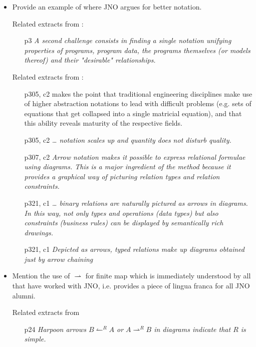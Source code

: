 \documentclass[runningheads,a4paper]{llncs}
\begin{document}
\begin{itemize}
\item Provide an example of where JNO argues for better notation.

Related extracts from \cite{DBLP:conf/lernet/Oliveira08}:
\begin{itemize}
  \item[p3] \it{A second challenge consists in finding a single notation unifying properties of programs, program data, the programs themselves (or models thereof) and their "desirable" relationships.}
\end{itemize}

Related extracts from \cite{DBLP:journals/tse/OliveiraF13}:
\begin{itemize}
  \item[p305, c2] makes the point that traditional engineering disciplines make use of higher abstraction notations to lead with difficult problems (e.g. sets of equations that get collapsed into a single matricial equation), and that this ability reveals maturity of the respective fields.
  \item[p305, c2] \it{… notation scales up and quantity does not disturb quality.}
  \item[p307, c2] \it{Arrow notation makes it possible to express relational formulae using diagrams. This is a major ingredient of the method because it provides a graphical way of picturing relation types and relation constraints.}
  \item[p321, c1] \it{… binary relations are naturally pictured as arrows in diagrams. In this way, not only types and operations (data types) but also constraints (business rules) can be displayed by semantically rich drawings.}
  \item[p321, c1] \it{Depicted as arrows, typed relations make up diagrams obtained just by arrow chaining}
\end{itemize}

\item Mention the use of $\rightharpoonup$ for finite map which is immediately understood by all that have worked with JNO, i.e. provides a piece of lingua franca for all JNO alumni.

Related extracts from \cite{DBLP:conf/lernet/Oliveira08}
\begin{itemize}
  \item[p24] \it{Harpoon arrows $B \leftharpoonup^{R} A$ or $A \rightharpoonup^R B$ in diagrams indicate that $R$ is simple.}
\end{itemize}


\end{itemize}
\end{document}
